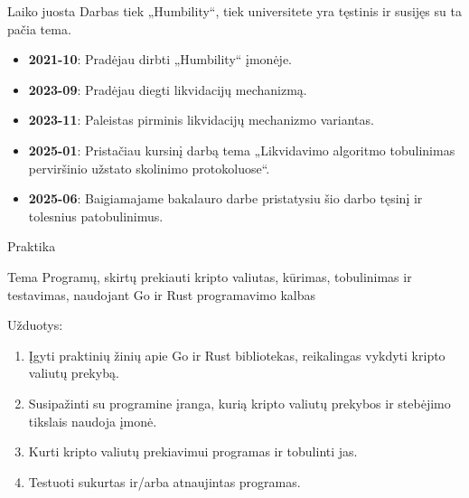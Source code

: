 \documentclass[12pt]{beamer}
\begin{document}
\begin{frame}{Laiko juosta}
  Darbas tiek „Humbility“, tiek universitete yra tęstinis ir susijęs su ta pačia tema.


  \begin{itemize}
    \item \textbf{2021-10}: Pradėjau dirbti „Humbility“ įmonėje.
    \item \textbf{2023-09}: Pradėjau diegti likvidacijų mechanizmą.
    \item \textbf{2023-11}: Paleistas pirminis likvidacijų mechanizmo variantas.
    \item \textbf{2025-01}: Pristačiau kursinį darbą tema „Likvidavimo algoritmo tobulinimas perviršinio užstato skolinimo protokoluose“.
    \item \textbf{2025-06}: Baigiamajame bakalauro darbe pristatysiu šio darbo tęsinį ir tolesnius patobulinimus.
  \end{itemize}
\end{frame}



  


\begin{frame}{Praktika}
  \begin{block}{Tema}
    Programų, skirtų prekiauti kripto valiutas, kūrimas, tobulinimas ir testavimas, naudojant Go ir Rust programavimo kalbas
  \end{block}
  
  Užduotys:
  \begin{enumerate}
    \item Įgyti praktinių žinių apie Go ir Rust bibliotekas, reikalingas vykdyti kripto valiutų
    prekybą.
    \item Susipažinti su programine įranga, kurią kripto valiutų prekybos ir stebėjimo tikslais naudoja įmonė.
    \item Kurti kripto valiutų prekiavimui programas ir tobulinti jas.
    \item Testuoti sukurtas ir/arba atnaujintas programas.
  \end{enumerate}
\end{frame}
\end{document}
